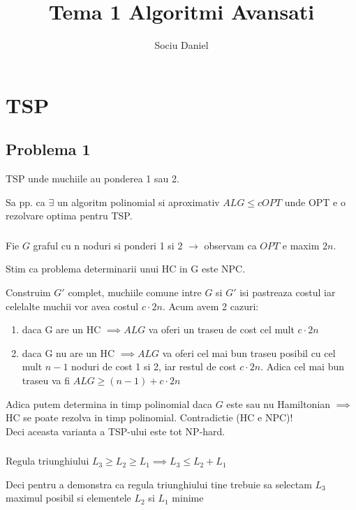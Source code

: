 \documentclass[a4paper]{report}
\title{Tema 1 Algoritmi Avansati}
\author{Sociu Daniel}
\begin{document}
\chapter*{TSP}
\setcounter{section}{0}
\section{Problema 1}
TSP unde muchiile au ponderea 1 sau 2. 

Sa pp. ca $\exists$ un algoritm polinomial si aproximativ $ALG\leq cOPT$ unde OPT e o rezolvare optima pentru TSP.

\subsection{}

Fie $G$ graful cu n noduri si ponderi 1 si 2 $\rightarrow$ observam ca $OPT$ e maxim $2n$.

Stim ca problema determinarii unui HC in G este NPC.

Construim $G'$ complet, muchiile comune intre $G$ si $G'$ isi pastreaza costul iar celelalte muchii vor avea costul $c\cdot 2n$. Acum avem 2 cazuri:

\begin{enumerate}
    \item daca G are un HC $\implies ALG$ va oferi un traseu de cost cel mult $c\cdot 2n$
    \item daca G nu are un HC $\implies ALG$ va oferi cel mai bun traseu posibil cu cel mult $n-1$ noduri de cost 1 si 2, iar restul de cost $c\cdot 2n$.
        Adica cel mai bun traseu va fi $ALG \geq (n-1) + c\cdot 2n$
\end{enumerate}

Adica putem determina in timp polinomial daca $G$ este sau nu Hamiltonian $\implies$ HC se poate rezolva in timp polinomial. Contradictie (HC e NPC)!\\

Deci aceasta varianta a TSP-ului este tot NP-hard.

\subsection{}

Regula triunghiului $L_{3}\geq L_{2} \geq L_{1} \implies L_{3}\leq L_{2} + L_{1}$

Deci pentru a demonstra ca regula triunghiului tine trebuie sa selectam $L_{3}$ maximul posibil si elementele $L_{2}$ si $L_{1}$ minime
\end{document}
